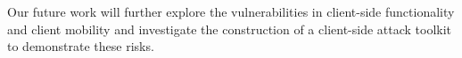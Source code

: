 \documentclass[10pt,twocolumn]{article}
\begin{document}



Our future work will further explore the vulnerabilities in
client-side functionality and client mobility and investigate the
construction of a client-side attack toolkit to demonstrate these
risks.




\end{document}

